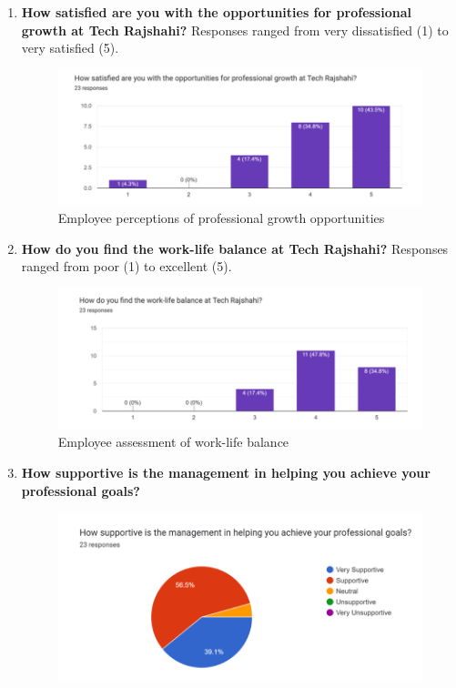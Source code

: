 \documentclass[12pt,a4paper]{article}
\begin{document}
\begin{enumerate}
    \newpage
    \item \textbf{How satisfied are you with the opportunities for professional growth at Tech Rajshahi?}  Responses ranged from very dissatisfied (1) to very satisfied (5).
    \begin{figure}[H]
        \centering
        \includegraphics[width=\textwidth]{Fig/pg.png}
        \caption{Employee perceptions of professional growth opportunities}
        \label{fig:professional_growth}
    \end{figure}
  \vspace{1cm}
    \item \textbf{How do you find the work-life balance at Tech Rajshahi?}  Responses ranged from poor (1) to excellent (5).
    \begin{figure}[H]
        \centering
        \includegraphics[width=\textwidth]{Fig/wlb.png}
        \caption{Employee assessment of work-life balance}
        \label{fig:work_life_balance}
    \end{figure}
\newpage
    \item \textbf{How supportive is the management in helping you achieve your professional goals?}  
    \begin{figure}[H]
        \centering
        \includegraphics[width=\textwidth]{Fig/hpg.png}

\end{figure}
\end{enumerate}
\end{document}
